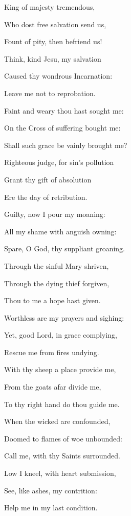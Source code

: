 {\begin{multicols}{2}
\begin{hangparas}{1.25em}{1}
\columnbreak
\par\noindent
King of majesty tremendous,\par\noindent
Who dost free salvation send us,\par\noindent
Fount of pity, then befriend us!\\
\par\noindent
Think, kind Jesu, my salvation\par\noindent
Caused thy wondrous Incarnation:\par\noindent
Leave me not to reprobation.\\
\par\noindent
Faint and weary thou hast sought me:\par\noindent
On the Cross of suffering bought me:\par\noindent
Shall such grace be vainly brought me?\\
\par\noindent
Righteous judge, for sin's pollution\par\noindent
Grant thy gift of absolution\par\noindent
Ere the day of retribution.\\
\par\noindent
Guilty, now I pour my moaning:\par\noindent
All my shame with anguish owning:\par\noindent
Spare, O God, thy suppliant groaning.\\
\par\noindent
Through the sinful Mary shriven,\par\noindent
Through the dying thief forgiven,\par\noindent
Thou to me a hope hast given.\\
\par\noindent
Worthless are my prayers and sighing:\par\noindent
Yet, good Lord, in grace complying,\par\noindent
Rescue me from fires undying.\\
\par\noindent
With thy sheep a place provide me,\par\noindent
From the goats afar divide me,\par\noindent
To thy right hand do thou guide me.\\
\par\noindent
When the wicked are confounded,\par\noindent
Doomed to flames of woe unbounded:\par\noindent
Call me, with thy Saints surrounded.\\
\par\noindent
Low I kneel, with heart submission,\par\noindent
See, like ashes, my contrition:\par\noindent
Help me in my last condition.%


\end{hangparas}
\end{multicols}}
